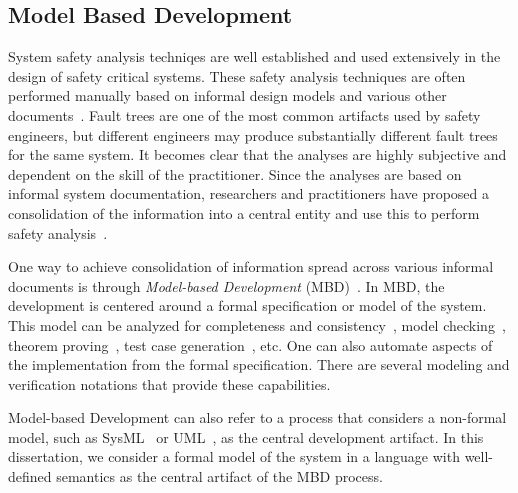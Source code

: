 \subsection{Model Based Development}
\label{sec:mbd}
System safety analysis techniqes are well established and used extensively in the design of safety critical systems. These safety analysis techniques are often performed manually based on informal design models and various other documents~\cite{schatz2002model,Joshi05:Dasc}. Fault trees are one of the most common artifacts used by safety engineers, but different engineers may produce substantially different fault trees for the same system. It becomes clear that the analyses are highly subjective and dependent on the skill of the practitioner. Since the analyses are based on informal system documentation, researchers and practitioners have proposed a consolidation of the information into a central entity and use this to perform safety analysis~\cite{joshi2008behavioral, Joshi05:SafeComp, Joshi07:Hase, CAV2015:BoCiGrMa, Bozzano:2010:DSA:1951720, lisagor2011model}.

One way to achieve consolidation of information spread across various informal documents is through \emph{Model-based Development} (MBD)~\cite{schatz2002model}. In MBD, the development is centered around a formal specification or model of the system. This model can be analyzed for completeness and consistency~\cite{heimdahl1996completeness}, model checking~\cite{miller2010software,clarke2018model, grumberg1994model}, theorem proving~\cite{rayadurgam2003using}, test case generation~\cite{anand2013orchestrated,rayadurgam2001coverage}, etc. One can also automate aspects of the implementation from the formal specification. There are several modeling and verification notations that provide these capabilities. 

Model-based Development can also refer to a process that considers a non-formal model, such as SysML~\cite{friedenthal2014practical} or UML~\cite{fowler2003brief}, as the central development artifact. In this dissertation, we consider a formal model of the system in a language with well-defined semantics as the central artifact of the MBD process. 

